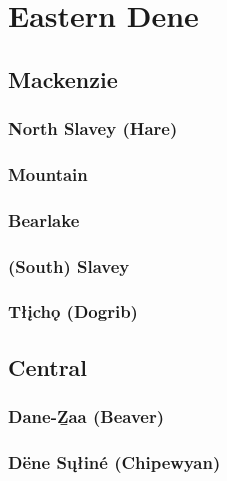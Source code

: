 \documentclass[12pt,letterpaper,oneside,article]{memoir}
\begin{document}
\section{Eastern Dene}\label{sec:eastern}

\subsection{Mackenzie}\label{sec:eastern-mackenzie}

\subsubsection{North Slavey (Hare)}\label{sec:northslavey}

\subsubsection{Mountain}\label{sec:mountain}

\subsubsection{Bearlake}\label{sec:bearlake}

\subsubsection{(South) Slavey}\label{sec:southslavey}

\subsubsection{Tłįchǫ (Dogrib)}\label{sec:tlicho}

\subsection{Central}\label{sec:eastern-central}

\subsubsection{Dane-Ẕaa (Beaver)}\label{sec:beaver}

\subsubsection{Dëne Sųłiné (Chipewyan)}\label{sec:chipewyan}
\end{document}
